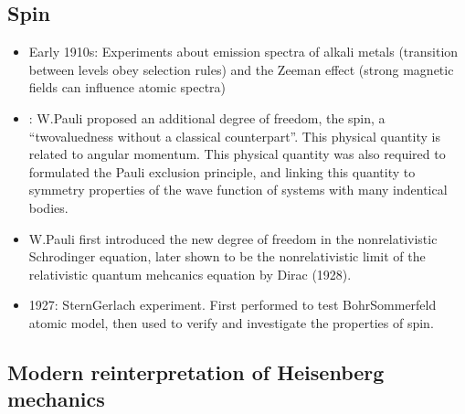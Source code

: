 \documentclass[letterpaper,10pt,english]{jupyterBook}
\begin{document}
\subsection{Spin}
\label{\detokenize{ch/quantum-mechanics/history/spin:spin}}\label{\detokenize{ch/quantum-mechanics/history/spin:quantum-mechanics-history-spin}}\label{\detokenize{ch/quantum-mechanics/history/spin::doc}}\begin{itemize}
\item {} 
\sphinxAtStartPar
Early 1910s: Experiments about emission spectra of alkali metals (transition between levels obey selection rules) and the Zeeman effect (strong magnetic fields can influence atomic spectra)

\item {} 
: W.Pauli proposed an additional degree of freedom, the spin, a “two\sphinxhyphen{}valuedness without a classical counterpart”. This physical quantity is related to angular momentum. This physical quantity was also required to formulated the Pauli exclusion principle, and linking this quantity to symmetry properties of the wave function of systems with many indentical bodies.

\item {} 
\sphinxAtStartPar
W.Pauli first introduced the new degree of freedom in the non\sphinxhyphen{}relativistic Schrodinger equation, later shown to be the non\sphinxhyphen{}relativistic limit of the relativistic quantum mehcanics equation by Dirac (1928).

\item {} 
\sphinxhyphen{}1927: Stern\sphinxhyphen{}Gerlach experiment. First performed to test Bohr\sphinxhyphen{}Sommerfeld atomic model, then used to verify and investigate the properties of spin.

\end{itemize}

\sphinxstepscope


\subsection{Modern reinterpretation of Heisenberg mechanics}
\label{\detokenize{ch/quantum-mechanics/history/heisenberg-reinterpretation:modern-reinterpretation-of-heisenberg-mechanics}}\label{\detokenize{ch/quantum-mechanics/history/heisenberg-reinterpretation:quantum-mechanics-history-heisenberg-reinterpretation}}\label{\detokenize{ch/quantum-mechanics/history/heisenberg-reinterpretation::doc}}
\end{document}
